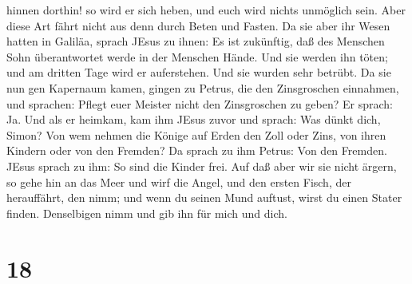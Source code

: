 hinnen dorthin! so wird er sich heben, und euch wird nichts unmöglich
sein.  Aber diese Art fährt nicht aus denn durch Beten und
Fasten.  Da sie aber ihr Wesen hatten in Galiläa, sprach
JEsus zu ihnen: Es ist zukünftig, daß des Menschen Sohn überantwortet
werde in der Menschen Hände.  Und sie werden ihn töten; und
am dritten Tage wird er auferstehen. Und sie wurden sehr betrübt.
 Da sie nun gen Kapernaum kamen, gingen zu Petrus, die den
Zinsgroschen einnahmen, und sprachen: Pflegt euer Meister nicht den
Zinsgroschen zu geben?  Er sprach: Ja. Und als er heimkam,
kam ihm JEsus zuvor und sprach: Was dünkt dich, Simon? Von wem nehmen
die Könige auf Erden den Zoll oder Zins, von ihren Kindern oder von den
Fremden?  Da sprach zu ihm Petrus: Von den Fremden. JEsus
sprach zu ihm: So sind die Kinder frei.  Auf daß aber wir
sie nicht ärgern, so gehe hin an das Meer und wirf die Angel, und den
ersten Fisch, der herauffährt, den nimm; und wenn du seinen Mund
auftust, wirst du einen Stater finden. Denselbigen nimm und gib ihn für
mich und dich.

\hypertarget{section-17}{%
\section{18}\label{section-17}}

